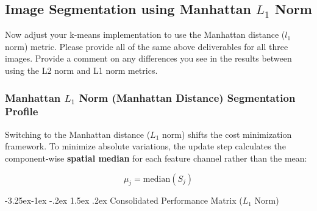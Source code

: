 \documentclass[twoside, 10pt]{article}
\makeatletter
\renewcommand{\paragraph}{\@startsection{paragraph}{4}{\z@}%
    {-3.25ex\@plus -1ex \@minus -.2ex}%
    {1.5ex \@plus .2ex}%
    {\normalfont\normalsize\bfseries}}
\makeatother
\begin{document}
\subsection{Image Segmentation using Manhattan $L_1$ Norm}

Now adjust your k-means implementation to use the Manhattan distance ($l_1$ norm) metric. Please provide all of the same above deliverables for all three images. Provide a comment on any
differences you see in the results between using the L2 norm and L1 norm metrics.

\subsubsection{Manhattan $L_1$ Norm (Manhattan Distance) Segmentation Profile}

Switching to the Manhattan distance ($L_1$ norm) shifts the cost minimization framework. To minimize absolute variations, the update step calculates the component-wise \textbf{spatial median} for each feature channel rather than the mean:

\begin{equation}
\mu_j = \text{median}(S_j)
\end{equation}

\paragraph{Consolidated Performance Matrix ($L_1$ Norm)}
\end{document}
